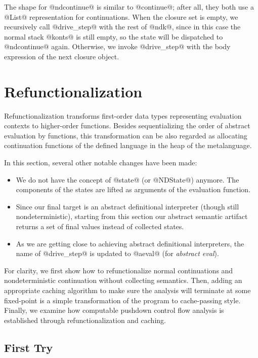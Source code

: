 \documentclass[acmsmall]{acmart}\settopmatter{}
\begin{document}
The shape for @ndcontinue@ is similar to @continue@; after
all, they both use a @List@ representation for continuations.
When the closure set is empty, we recursively call @drive_step@ with the rest
of @ndk@, since in this case the normal stack @konts@ is still empty, so
the state will be dispatched to @ndcontinue@ again.
Otherwise, we invoke @drive_step@ with the body expression of the next closure object.

\section{Refunctionalization} \label{sec:refunc}

Refunctionalization transforms first-order data types representing
evaluation contexts to higher-order functions.
Besides sequentializing the order of abstract evaluation by functions,
this transformation can be also regarded as allocating continuation functions of
the defined language in the heap of the metalanguage.

In this section, several other notable changes have been made:
\begin{itemize}
\item We do not have the concept of @state@ (or @NDState@) anymore.
The components of the states are lifted as arguments of the evaluation
function.
\item Since our final target is an abstract definitional interpreter (though still
nondeterministic), starting from this section our abstract semantic artifact
returns a set of final values instead of collected states.
\item As we are getting close to achieving
abstract definitional interpreters, the name of @drive_step@ is updated to
@aeval@ (for \emph{abstract eval}).
\end{itemize}

For clarity, we first show how to refunctionalize normal continuations and
nondeterministic continuation without collecting semantics.
Then, adding an appropriate caching algorithm to make sure the analysis will
terminate at some fixed-point is a simple transformation of the program to cache-passing
style. Finally, we examine how computable pushdown control flow analysis is established
through refunctionalization and caching.

\subsection{First Try}
\end{document}
